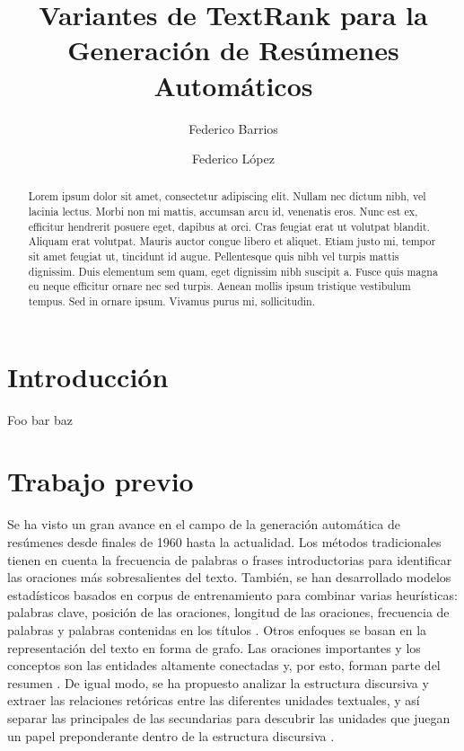 \documentclass{llncs}
\begin{document}
\frontmatter
\pagestyle{headings}

\title{Variantes de TextRank para la Generación de Resúmenes Automáticos}

\author{Federico Barrios \and Federico López}

\maketitle

\begin{abstract}
Lorem ipsum dolor sit amet, consectetur adipiscing elit. Nullam nec dictum 
nibh, vel lacinia lectus. Morbi non mi mattis, accumsan arcu id, venenatis 
eros. Nunc est ex, efficitur hendrerit posuere eget, dapibus at orci. 
Cras feugiat erat ut volutpat blandit. Aliquam erat volutpat. Mauris 
auctor congue libero et aliquet. Etiam justo mi, tempor sit amet feugiat 
ut, tincidunt id augue. Pellentesque quis nibh vel turpis mattis dignissim. 
Duis elementum sem quam, eget dignissim nibh suscipit a. Fusce quis magna 
eu neque efficitur ornare nec sed turpis. Aenean mollis ipsum tristique vestibulum tempus. 
Sed in ornare ipsum. Vivamus purus mi, sollicitudin.

\end{abstract}

\section{Introducción}
Foo bar baz

\section{Trabajo previo}
Se ha visto un gran avance en el campo de la generación automática de resúmenes desde finales de 1960 hasta la actualidad. Los métodos tradicionales tienen en cuenta la frecuencia de palabras o frases introductorias para identificar las oraciones más sobresalientes del texto. También, se han desarrollado modelos estadísticos basados en corpus de entrenamiento para combinar varias heurísticas: palabras clave, posición de las oraciones, longitud de las oraciones, frecuencia de palabras y palabras contenidas en los títulos \cite{hovy}. Otros enfoques se basan en la representación del texto en forma de grafo. Las oraciones importantes y los conceptos son las entidades altamente conectadas y, por esto, forman parte del resumen \cite{barzilay}. De igual modo, se ha propuesto analizar la estructura discursiva y extraer las relaciones retóricas entre las diferentes unidades textuales, y así separar las principales de las secundarias para descubrir las unidades que juegan un papel preponderante dentro de la estructura discursiva \cite{marcu}.
\end{document}
